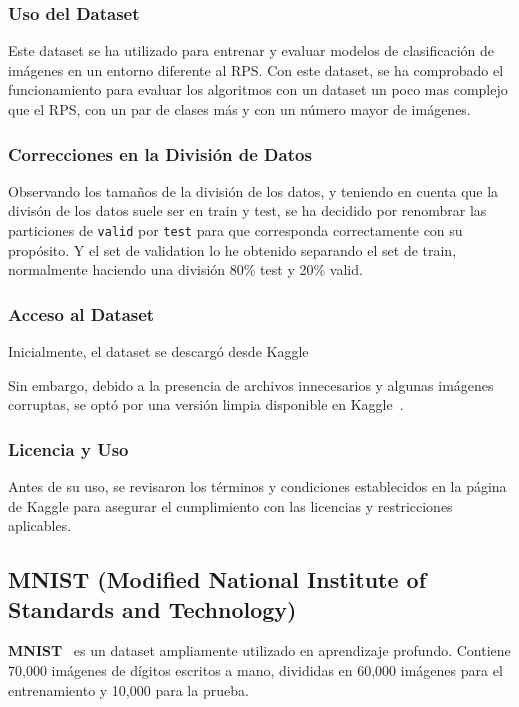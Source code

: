 \subsubsection{Uso del Dataset}
Este dataset se ha utilizado para entrenar y evaluar modelos de clasificación de imágenes en un entorno diferente al
RPS\@.
Con este dataset, se ha comprobado el funcionamiento para evaluar los algoritmos con un dataset un poco mas complejo
que el RPS, con un par de clases más y con un número mayor de imágenes.

\subsubsection{Correcciones en la División de Datos}
Observando los tamaños de la división de los datos, y teniendo en cuenta que la divisón de los datos suele ser en train
y test, se ha decidido por renombrar las particiones de \texttt{valid} por \texttt{test} para que corresponda
correctamente con su propósito.
Y el set de validation lo he obtenido separando el set de train, normalmente haciendo una división 80\% test y 20\%
valid.

\subsubsection{Acceso al Dataset}
Inicialmente, el dataset se descargó desde Kaggle~\cite{noauthor_original_nodate}

Sin embargo, debido a la presencia de archivos innecesarios y algunas imágenes corruptas, se optó por una versión
limpia disponible en Kaggle~\cite{noauthor_cleaned_nodate}.

\subsubsection{Licencia y Uso}
Antes de su uso, se revisaron los términos y condiciones establecidos en la página de Kaggle para asegurar el
cumplimiento con las licencias y restricciones aplicables.

\subsection{MNIST (Modified National Institute of Standards and Technology)}\label{subsec:mnist}
\textbf{MNIST}~\cite{noauthor_mnist_nodate} es un dataset ampliamente utilizado en aprendizaje profundo.
Contiene 70,000 imágenes de dígitos escritos a mano, divididas en 60,000 imágenes para el entrenamiento y 10,000 para
la prueba.

